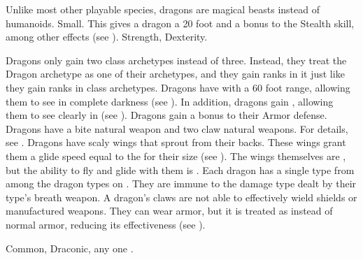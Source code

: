          Unlike most other playable species, dragons are magical beasts instead of humanoids.
         Small. This gives a dragon a 20 foot  and a  bonus to the Stealth skill, among other effects (see ).
          Strength,  Dexterity.
        \begin{itemize}
             Dragons only gain two class archetypes instead of three.
                Instead, they treat the Dragon archetype as one of their archetypes, and they gain ranks in it just like they gain ranks in class archetypes.
             Dragons have  with a 60 foot range, allowing them to see in complete darkness (see ).
                In addition, dragons gain , allowing them to see clearly in  (see ).
             Dragons gain a  bonus to their Armor defense.
             Dragons have a bite natural weapon and two claw natural weapons.
                For details, see .
             Dragons have scaly wings that sprout from their backs.
                These wings grant them a glide speed equal to the  for their size (see ).
                The wings themselves are , but the ability to fly and glide with them is \magical.
             Each dragon has a single type from among the dragon types on .
                They are immune to the damage type dealt by their type's breath weapon.
             A dragon's claws are not able to effectively wield shields or manufactured weapons.
                They can wear armor, but it is treated as  instead of normal armor, reducing its effectiveness (see ).
        \end{itemize}
         Common, Draconic, any one .

